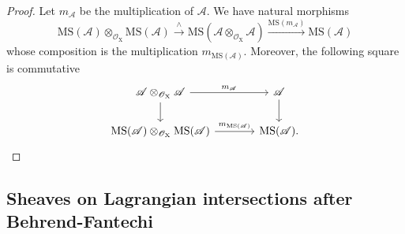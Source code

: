 \documentclass{article}
\theoremstyle{plain}
\theoremstyle{definition}
\theoremstyle{remark}
\newcommand{\mr}{\mathrm}
\newcommand{\MS}{\mr{MS}}
\newcommand{\3}{\vspace{3mm}}
\newcommand{\2}{\vspace{2mm}}
\newcommand{\1}{\vspace{1mm}}
\begin{document}
\begin{proof}
Let $m_\mathscr{A}$ be the multiplication of $\mathscr{A}$. We have natural morphisms $$\MS(\mathscr{A})\otimes_{\mathscr{O}_\mr{X}}\MS(\mathscr{A}) \xrightarrow{\wedge} \MS(\mathscr{A}\otimes_{\mathscr{O}_\mr{X}}\mathscr{A})\xrightarrow{\MS(m_\mathscr{A})} \MS(\mathscr{A})$$ whose composition is the multiplication $m_{\MS(\mathscr{A})}$. Moreover, the following square is commutative \[
\begin{tikzcd}[column sep=large]
 \mathscr{A}\otimes_{\mathscr{O}_\mr{X}}\mathscr{A} \arrow[d] \arrow[r, "m_\mathscr{A}"]& \mathscr{A}  \arrow[d]
 \\
\MS(\mathscr{A})\otimes_{\mathscr{O}_\mr{X}}\MS(\mathscr{A})  \arrow[r,"m_{\MS(\mathscr{A})}"]
  & \MS(\mathscr{A}).
\end{tikzcd}
\]
\end{proof}

\subsection{Sheaves on Lagrangian intersections after Behrend-Fantechi}
\end{document}
